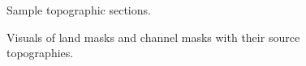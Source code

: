 \begin{figure}[!ht]
	\caption{Sample topographic sections.}
	\label{fig:np_sections}
\end{figure}

\begin{figure}[!ht]
	\caption{Visuals of land masks and channel masks with their source topographies.}
	\label{fig:np_masks}
\end{figure}

